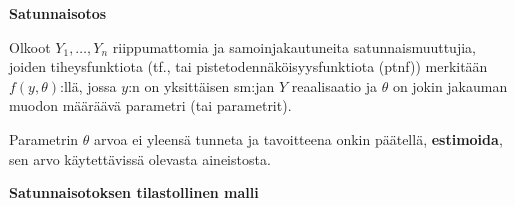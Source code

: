 \documentclass[
]{book}
\begin{document}
\begin{defblock}{}
\textbf{Satunnaisotos}

Olkoot \(Y_1, \ldots, Y_n\) riippumattomia ja samoinjakautuneita satunnaismuuttujia, joiden tiheysfunktiota (tf., tai pistetodennäköisyysfunktiota (ptnf)) merkitään \(f(y, \theta)\):llä, jossa \(y\):n on yksittäisen sm:jan \(Y\) reaalisaatio ja \(\theta\) on jokin jakauman muodon määräävä parametri (tai parametrit).

Parametrin \(\theta\) arvoa ei yleensä tunneta ja tavoitteena onkin päätellä, \textbf{estimoida}, sen arvo käytettävissä olevasta aineistosta.

\end{defblock}

\hfill\break

\textbf{Satunnaisotoksen tilastollinen malli}
\end{document}
